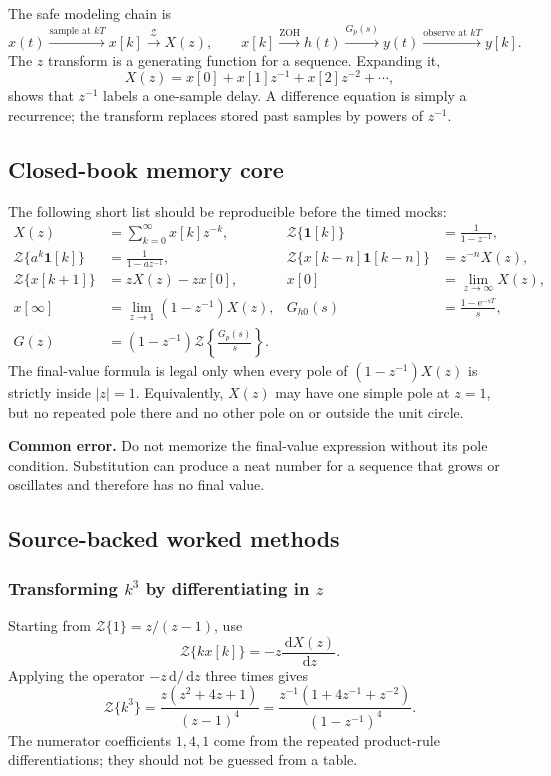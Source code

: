 \documentclass[11pt]{article}
\newcommand{\Z}{\mathcal{Z}}
\newcommand{\dd}{\,\mathrm{d}}
\newcommand{\e}{\mathrm{e}}
\newcommand{\unitstep}{\mathbf{1}}
\newcommand{\commonerror}[1]{\par\smallskip\noindent\colorbox{red!8}{\parbox{\dimexpr\linewidth-2\fboxsep\relax}{\textbf{Common error.} #1}}\par\smallskip}
\begin{document}
The safe modeling chain is
\[
x(t)\xrightarrow{\text{sample at }kT}x[k]
\xrightarrow{\Z}X(z),
\qquad
x[k]\xrightarrow{\text{ZOH}}h(t)\xrightarrow{G_p(s)}y(t)
\xrightarrow{\text{observe at }kT}y[k].
\]
The $z$ transform is a generating function for a sequence.  Expanding it,
\[
X(z)=x[0]+x[1]z^{-1}+x[2]z^{-2}+\cdots,
\]
shows that $z^{-1}$ labels a one-sample delay.  A difference equation is simply a recurrence; the transform replaces stored past samples by powers of $z^{-1}$.

\subsection{Closed-book memory core}

The following short list should be reproducible before the timed mocks:
\begin{align*}
X(z)&=\sum_{k=0}^{\infty}x[k]z^{-k},
&\Z\{\unitstep[k]\}&=\frac{1}{1-z^{-1}},\\
\Z\{a^k\unitstep[k]\}&=\frac{1}{1-az^{-1}},
&\Z\{x[k-n]\unitstep[k-n]\}&=z^{-n}X(z),\\
\Z\{x[k+1]\}&=zX(z)-zx[0],
&x[0]&=\lim_{z\to\infty}X(z),\\
x[\infty]&=\lim_{z\to1}(1-z^{-1})X(z),
&G_{h0}(s)&=\frac{1-\e^{-sT}}{s},\\
G(z)&=(1-z^{-1})\Z\!\left\{\frac{G_p(s)}{s}\right\}.
\end{align*}
The final-value formula is legal only when every pole of $(1-z^{-1})X(z)$ is strictly inside $|z|=1$.  Equivalently, $X(z)$ may have one simple pole at $z=1$, but no repeated pole there and no other pole on or outside the unit circle.

\commonerror{Do not memorize the final-value expression without its pole condition.  Substitution can produce a neat number for a sequence that grows or oscillates and therefore has no final value.}

\subsection{Source-backed worked methods}

\subsubsection*{Transforming $k^3$ by differentiating in $z$}

Starting from $\Z\{1\}=z/(z-1)$, use
\[
\Z\{k x[k]\}=-z\frac{\dd X(z)}{\dd z}.
\]
Applying the operator $-z\dd/\dd z$ three times gives
\[
\Z\{k^3\}
=\frac{z(z^2+4z+1)}{(z-1)^4}
=\frac{z^{-1}(1+4z^{-1}+z^{-2})}{(1-z^{-1})^4}.
\]
The numerator coefficients $1,4,1$ come from the repeated product-rule differentiations; they should not be guessed from a table.
\end{document}

